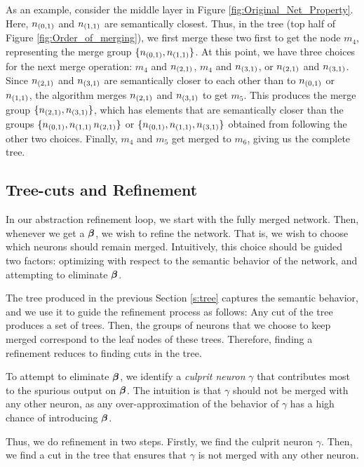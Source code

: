 As an example, consider the middle layer in Figure
\ref{fig:Original_Net_Property}. Here, $n_{(0,1)}$ and $n_{(1,1)}$ are
semantically closest. Thus, in the tree (top half of Figure
\ref{fig:Order_of_merging}), we first merge these two first to get the
node $m_4$, representing the merge group $\{n_{(0,1)}, n_{(1,1)}\}$. At this
point, we have three choices for the next merge operation: $m_4$ and
$n_{(2,1)}$, $m_4$ and $n_{(3,1)}$, or $n_{(2,1)}$ and $n_{(3,1)}$. Since
$n_{(2,1)}$ and $n_{(3,1)}$ are semantically closer to each other than to
$n_{(0,1)}$ or $n_{(1,1)}$, the algorithm merges
$n_{(2,1)}$ and $n_{(3,1)}$ to get $m_5$. This produces the merge group
$\{n_{(2,1)}, n_{(3,1)}\}$, which has elements that are semantically closer than
the groups $\{n_{(0,1)}, n_{(1,1)}\, n_{(2,1)}\}$ or $\{n_{(0,1)}, n_{(1,1)},
n_{(3,1)} \}$ obtained from following the other two choices. 
Finally, $m_4$ and $m_5$ get merged to $m_6$, giving us the complete tree.

\subsection{Tree-cuts and Refinement}
\label{s:refinement}



In our abstraction refinement loop, we start with the fully merged network.
Then, whenever we get a \gencex $\boldsymbol{\beta}$, we
wish to refine the network. That is, we wish to choose which
neurons should remain merged. Intuitively, this choice should be guided
two factors: optimizing with respect to the semantic behavior of the network,
and attempting to eliminate $\boldsymbol{\beta}$. 

The tree produced in the previous Section \ref{s:tree} captures the semantic
behavior, and we use it to guide the refinement process as follows:
Any cut of the tree produces a set of trees. Then,  
the groups of neurons that we choose to keep merged correspond to the leaf nodes
of these trees. Therefore, finding a refinement reduces to finding cuts
in the tree.

To attempt to eliminate $\boldsymbol{\beta}$, we identify a \textit{culprit neuron}
$\gamma$ that contributes most to the spurious output on $\boldsymbol{\beta}$. The
intuition is that $\gamma$ should not be merged with any other neuron, as any
over-approximation of the behavior of $\gamma$ has a high chance of
introducing $\boldsymbol{\beta}$.

Thus, we do refinement in two steps. Firstly, we find the culprit neuron
$\gamma$. Then, we find a cut in the tree that ensures that $\gamma$ is not
merged with any other neuron.

